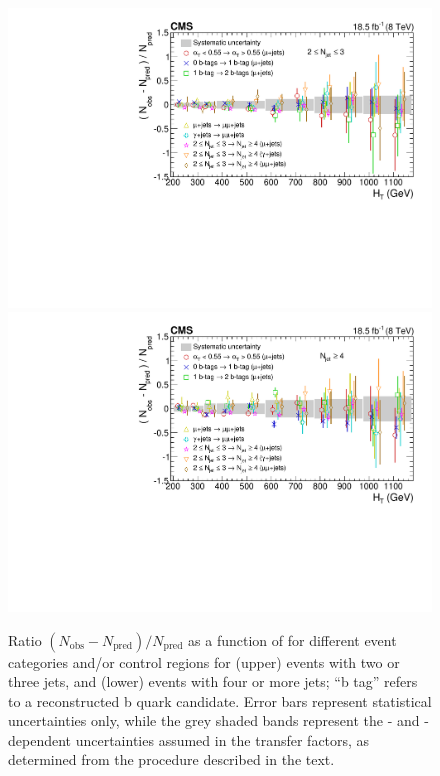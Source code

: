\begin{figure}[htbp]
  \centering
      \includegraphics[width=\cmsFigWidth]{Figure_001-a.pdf}
      \includegraphics[width=\cmsFigWidth]{Figure_001-b.pdf}
    \caption{
      Ratio $(N_\text{obs} - N_\text{pred})/N_\text{pred}$ as a
      function of \scalht for different event categories and/or
      control regions for (upper) events with two or three jets, and
      (lower) events with four or more jets; ``b tag'' refers to a
      reconstructed b quark candidate.
      Error bars represent statistical uncertainties only, while the
      grey shaded bands represent the \njet- and \scalht-dependent
      uncertainties assumed in the transfer factors, as determined
      from the procedure described in the text.
      \label{fig:closure}
    }
\end{figure}

